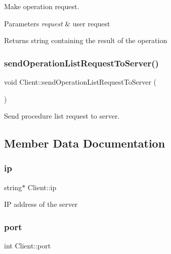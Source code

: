 Make operation request. 
\begin{DoxyParams}{Parameters}
{\em request} & user request \\
\hline
\end{DoxyParams}
\begin{DoxyReturn}{Returns}
string containing the result of the operation 
\end{DoxyReturn}
\mbox{\label{classClient_a0ebe2a9ba72088ed1863a6d3eb3729bf}} 
\subsubsection{\texorpdfstring{send\+Operation\+List\+Request\+To\+Server()}{sendOperationListRequestToServer()}}
{\footnotesize\ttfamily void Client\+::send\+Operation\+List\+Request\+To\+Server (\begin{DoxyParamCaption}{ }\end{DoxyParamCaption})\hspace{0.3cm}{\ttfamily [private]}}

Send procedure list request to server. 

\subsection{Member Data Documentation}
\mbox{\label{classClient_a0dcc58589f647de09ac3bb9b0c047344}} 
\subsubsection{\texorpdfstring{ip}{ip}}
{\footnotesize\ttfamily string$\ast$ Client\+::ip\hspace{0.3cm}{\ttfamily [private]}}

IP address of the server \mbox{\label{classClient_aad8864d1362eae7c50e53c0d131b7442}} 
\subsubsection{\texorpdfstring{port}{port}}
{\footnotesize\ttfamily int Client\+::port\hspace{0.3cm}{\ttfamily [private]}}

